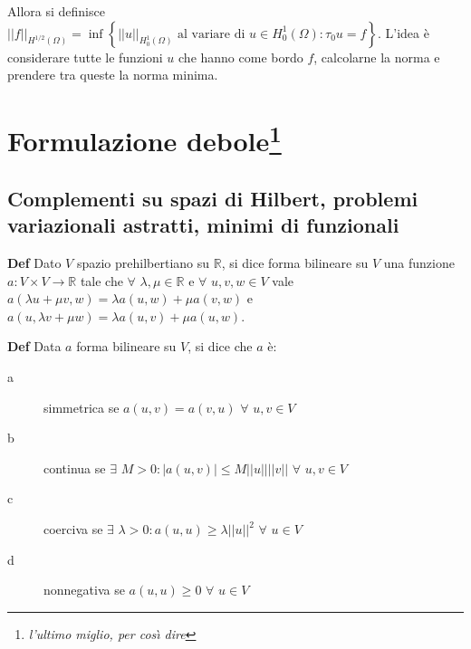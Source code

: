 \documentclass{article}
\begin{document}
Allora si definisce $\left\vert \left\vert f\right\vert \right\vert
_{H^{1/2}\left( \Omega \right) }=\inf \left\{ \left\vert \left\vert
u\right\vert \right\vert _{H_{0}^{1}\left( \Omega \right) }\text{ al variare
di }u\in H_{0}^{1}\left( \Omega \right) :\tau _{0}u=f\right\} $. L'idea \`{e}
considerare tutte le funzioni $u$ che hanno come bordo $f$, calcolarne la
norma e prendere tra queste la norma minima.

\section{Formulazione debole\protect\footnote{\textit{l'ultimo miglio, per
cos\`{\i} dire}}}

\subsection{Complementi su spazi di Hilbert, problemi variazionali astratti,
minimi di funzionali}

\textbf{Def} Dato $V$ spazio prehilbertiano su $%
\mathbb{R}
$, si dice forma bilineare su $V$ una funzione $a:V\times V\rightarrow 
\mathbb{R}
$ tale che $\forall $ $\lambda ,\mu \in 
\mathbb{R}
$ e $\forall $ $u,v,w\in V$ vale $a\left( \lambda u+\mu v,w\right) =\lambda
a\left( u,w\right) +\mu a\left( v,w\right) $ e $a\left( u,\lambda v+\mu
w\right) =\lambda a\left( u,v\right) +\mu a\left( u,w\right) $.

\textbf{Def} Data $a$ forma bilineare su $V$, si dice che $a$ \`{e}:

\begin{description}
\item[a] simmetrica se $a\left( u,v\right) =a\left( v,u\right) $ $\forall $ $%
u,v\in V$

\item[b] continua se $\exists $ $M>0:\left\vert a\left( u,v\right)
\right\vert \leq M\left\vert \left\vert u\right\vert \right\vert \left\vert
\left\vert v\right\vert \right\vert $ $\forall $ $u,v\in V$

\item[c] coerciva se $\exists $ $\lambda >0:a\left( u,u\right) \geq \lambda
\left\vert \left\vert u\right\vert \right\vert ^{2}$ $\forall $ $u\in V$

\item[d] nonnegativa se $a\left( u,u\right) \geq 0$ $\forall $ $u\in V$
\end{description}
\end{document}
